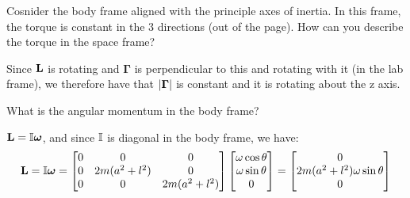 Cosnider the body frame aligned with the principle axes of inertia.  In this frame, the torque is constant in the 3 directions (out of the page). How can you describe the torque in the space frame?
\begin{s}
Since $\mathbf{L}$ is rotating and $\bm{\Gamma}$ is perpendicular to this and rotating with it (in the lab frame), we therefore have that $\abs{\bm{\Gamma}}$ is constant and it is rotating about the z axis.
\end{s}
What is the angular momentum in the body frame?
\begin{s}
$\mathbf{L} = \mathbb{I}\bm{\omega}$, and since $\mathbb{I}$ is diagonal in the body frame, we have:
\[\mathbf{L} = \mathbb{I}\bm{\omega} = \begin{bmatrix}0 & 0 & 0 \\ 0 & 2m(a^2+l^2) & 0 \\ 0 & 0 & 2m(a^2 + l^2)\end{bmatrix}\begin{bmatrix}\omega\cos\theta \\ \omega\sin\theta \\ 0\end{bmatrix} = \begin{bmatrix}0 \\ 2m(a^2+l^2)\omega\sin\theta \\ 0\end{bmatrix}\]
\end{s}

